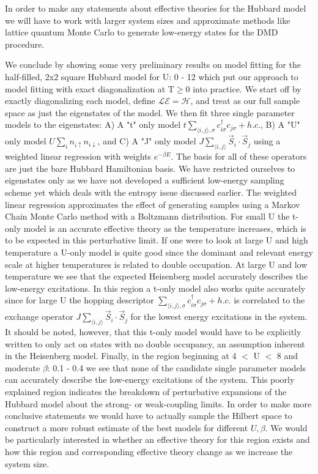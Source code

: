 \documentclass{article}
\begin{document}
In order to make any statements about effective theories for the Hubbard model we will have to work with larger system sizes and approximate methods like lattice quantum Monte Carlo to generate low-energy states for the DMD procedure.

We conclude by showing some very preliminary results on model fitting for the half-filled, 2x2 square Hubbard model for U: 0 - 12 which put our approach to model fitting with exact diagonalization at T$\geq 0$ into practice.
We start off by exactly diagonalizing each model, define $\mathcal{LE} = \mathcal{H}$, and treat as our full sample space as just the eigenstates of the model.
We then fit three single parameter models to the eigenstates: A) 
A "t" only model $t \sum_{\langle i, j \rangle, \sigma} c_{i\sigma}^\dagger c_{j\sigma} + h.c.$, B) A "U" only model $U \sum_{i} n_{i\uparrow} n_{i\downarrow}$, and C) A "J" only model $J \sum_{\langle i,j \rangle} \vec{S}_i \cdot \vec{S}_j$ using a weighted linear regression with weights $e^{-\beta E}$.
The basis for all of these operators are just the bare Hubbard Hamiltonian basis.
We have restricted ourselves to eigenstates only as we have not developed a sufficient low-energy sampling scheme yet which deals with the entropy issue discussed earlier.
The weighted linear regression approximates the effect of generating samples using a Markov Chain Monte Carlo method with a Boltzmann distribution.
For small U the t-only model is an accurate effective theory as the temperature increases, which is to be expected in this perturbative limit.
If one were to look at large U and high temperature a U-only model is quite good since the dominant and relevant energy scale at higher temperatures is related to double occupation.
At large U and low temperature we see that the expected Heisenberg model accurately describes the low-energy excitations. 
In this region a t-only model also works quite accurately since for large U the hopping descriptor $\sum_{\langle i, j \rangle, \sigma} c_{i\sigma}^\dagger c_{j\sigma} + h.c.$ is correlated to the exchange operator $J \sum_{\langle i,j \rangle} \vec{S}_i \cdot \vec{S}_j$ for the lowest energy excitations in the system.
It should be noted, however, that this t-only model would have to be explicitly written to only act on states with no double occupancy, an assumption inherent in the Heisenberg model. 
Finally, in the region beginning at 4 $<$ U $<$ 8 and moderate $\beta$: 0.1 - 0.4 we see that none of the candidate single parameter models can accurately describe the low-energy excitations of the system.
This poorly explained region indicates the breakdown of perturbative expansions of the Hubbard model about the strong- or weak-coupling limits.
In order to make more conclusive statements we would have to actually sample the Hilbert space to construct a more robust estimate of the best models for different $U, \beta$.
We would be particularly interested in whether an effective theory for this region exists and how this region and corresponding effective theory change as we increase the system size.
\end{document}
